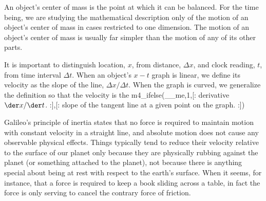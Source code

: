 \begin{summary}

\begin{vocab}



\end{vocab}

\begin{notation}

\end{notation}

\begin{othernotation}

\end{othernotation}

\begin{summarytext}

An object's center of mass is the point at which it can be
balanced. For the time being, we are studying the mathematical
description only of the motion of an object's center of mass
in cases restricted to one dimension. The motion of an
object's center of mass is usually far simpler than the
motion of any of its other parts.

It is important to distinguish location, $x$, from distance,
$\Delta x$, and clock reading, $t$, from time interval
$\Delta t$. When an object's $x-t$ graph is linear, we
define its velocity as the slope of the line, 
$\Delta x/\Delta t$. When the graph is curved, we generalize the
definition so that the velocity is the
m4_ifelse(__me,1,[:%
derivative $\der x/\der t$.
:],[:%
slope of the tangent
line at a given point on the graph.
:])

Galileo's principle of inertia states that no force is
required to maintain motion with constant velocity in a
straight line, and absolute motion does not cause any
observable physical effects. Things typically tend to reduce
their velocity relative to the surface of our planet only
because they are physically rubbing against the planet (or
something attached to the planet), not because there is
anything special about being at rest with respect to the
earth's surface. When it seems, for instance, that a force
is required to keep a book sliding across a table, in fact
the force is only serving to cancel the contrary force of friction.


\end{summarytext}
\end{summary}
